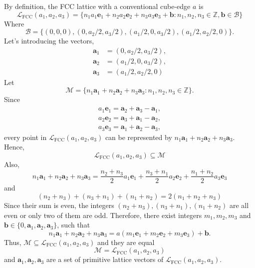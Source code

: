 \documentclass[a4paper,11pt]{article}
\begin{document}
By definition, the FCC lattice with a conventional cube-edge $a$ is
\begin{equation}
    \mathcal L_{\mathrm{FCC}}(a_1, a_2, a_3)=\{n_1a_1\mathbf e_1+n_2a_2\mathbf e_2 + n_3a_3\mathbf e_3+\mathbf b:n_1, n_2, n_3\in\mathbb Z, \mathbf b\in\mathcal B\}
\end{equation}
Where
\begin{equation}
    \mathcal B=\{(0, 0, 0), (0, a_2/2, a_3/2), (a_1/2, 0, a_3/2), (a_1/2, a_2/2, 0)\}.
\end{equation}
Let's introducing the vectors,
\begin{align}
    \mathbf a_1&=(0, a_2/2, a_3/2),\\ 
    \mathbf a_2&=(a_1/2, 0, a_3/2),\\ 
    \mathbf a_3&=(a_1/2, a_2/2, 0)
\end{align}
Let
\begin{equation}
    \mathcal M=\{n_1\mathbf a_1+n_2\mathbf a_2 + n_3\mathbf a_3:n_1, n_2, n_3\in\mathbb Z\}.
\end{equation}
Since
\begin{align}
    a_1\mathbf e_1=\mathbf a_2 + \mathbf a_3 - \mathbf a_1, \\
    a_2\mathbf e_2=\mathbf a_3 + \mathbf a_1 - \mathbf a_2, \\
    a_3\mathbf e_3=\mathbf a_1 + \mathbf a_2 - \mathbf a_3,
\end{align}
every point in $\mathcal L_{\mathrm{FCC}}(a_1, a_2, a_3)$ can be represented by $n_1\mathbf a_1+n_2\mathbf a_2 + n_3\mathbf a_3$. Hence,
\begin{equation}
    \mathcal L_{\mathrm{FCC}}(a_1, a_2, a_3)\subseteq \mathcal M
\end{equation}
Also, 
\begin{equation}
    n_1\mathbf a_1+n_2\mathbf a_2 + n_3\mathbf a_3=\frac{n_2 + n_3}{2}a_1\mathbf e_1+\frac{n_3 + n_1}{2}a_2\mathbf e_2 + \frac{n_1 + n_2}{2}a_3\mathbf e_3
\end{equation}
and
\begin{equation}
    (n_2 + n_3) + (n_3 + n_1) + (n_1 + n_2) = 2(n_1+n_2+n_3)
\end{equation}
Since their sum is even, the integers $(n_2 + n_3), (n_3 + n_1), (n_1 + n_2)$ are all even or only two of them are odd. Therefore, there exist integers $m_1, m_2, m_3$ and $\mathbf b\in \{0, \mathbf a_1, \mathbf a_2, \mathbf a_3\}$, such that
\begin{equation}
    n_1\mathbf a_1+n_2\mathbf a_2 + n_3\mathbf a_3=a(m_1\mathbf e_1+m_2\mathbf e_2 + m_3\mathbf e_3) + \mathbf b.
\end{equation}
Thus, $\mathcal M\subseteq \mathcal L_{\mathrm{FCC}}(a_1, a_2, a_3)$ and they are equal
\begin{equation}
    \mathcal M = \mathcal L_{\mathrm{FCC}}(a_1, a_2, a_3)
\end{equation}
and $\mathbf a_1, \mathbf a_2, \mathbf a_3$ are a set of primitive lattice vectors of $\mathcal L_{\mathrm{FCC}}(a_1, a_2, a_3)$.
\end{document}
